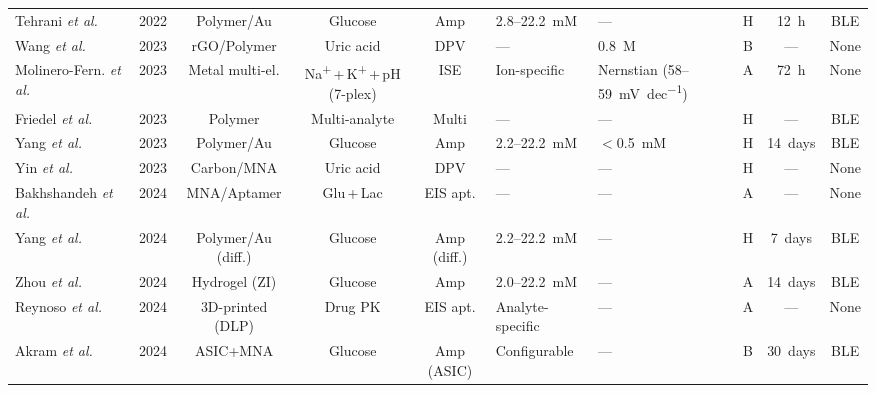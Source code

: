 \documentclass[review,1p]{elsarticle}
\begin{document}
\begin{table}[htbp]
{\begin{tabular}{p{3.0cm}ccccp{2.2cm}p{1.6cm}ccc}
Tehrani \textit{et al.}~\cite{Tehrani2022NatBiomedEng}    & 2022 & Polymer/Au          & Glucose             & Amp        & 2.8--22.2~mM                  & ---                             & H & 12~h     & BLE \\
Wang \textit{et al.}~\cite{Wang2023rGO}                   & 2023 & rGO/Polymer         & Uric acid           & DPV        & ---                           & 0.8~\textmu{}M                  & B & ---      & None \\
Molinero-Fern. \textit{et al.}~\cite{MolineroFernandez2023} & 2023 & Metal multi-el.   & Na\textsuperscript{+}\,+\,K\textsuperscript{+}\,+\,pH (7-plex) & ISE & Ion-specific & Nernstian (58--59~mV~dec\textsuperscript{$-1$}) & A & 72~h & None \\
Friedel \textit{et al.}~\cite{Friedel2023}                & 2023 & Polymer             & Multi-analyte       & Multi      & ---                           & ---                             & H & ---      & BLE \\
Yang \textit{et al.}~\cite{Yang2023CGM14day}              & 2023 & Polymer/Au          & Glucose             & Amp        & 2.2--22.2~mM                  & $<$0.5~mM                       & H & 14~days  & BLE \\
Yin \textit{et al.}~\cite{Yin2023UA}                      & 2023 & Carbon/MNA          & Uric acid           & DPV        & ---                           & ---                             & H & ---      & None \\
Bakhshandeh \textit{et al.}~\cite{Bakhshandeh2024}        & 2024 & MNA/Aptamer         & Glu\,+\,Lac         & EIS apt.   & ---                           & ---                             & A & ---      & None \\
Yang \textit{et al.}~\cite{Yang2024Differential}          & 2024 & Polymer/Au (diff.)  & Glucose             & Amp (diff.)& 2.2--22.2~mM                  & ---                             & H & 7~days   & BLE \\
Zhou \textit{et al.}~\cite{Zhou2024}                      & 2024 & Hydrogel (ZI)       & Glucose             & Amp        & 2.0--22.2~mM                  & ---                             & A & 14~days  & BLE \\
Reynoso \textit{et al.}~\cite{Reynoso2024}                & 2024 & 3D-printed (DLP)    & Drug PK             & EIS apt.   & Analyte-specific              & ---                             & A & ---      & None \\
Akram \textit{et al.}~\cite{Akram2024ISSCC}               & 2024 & ASIC+MNA            & Glucose             & Amp (ASIC) & Configurable                  & ---                             & B & 30~days  & BLE \\

\end{tabular}}
\end{table}
\end{document}
